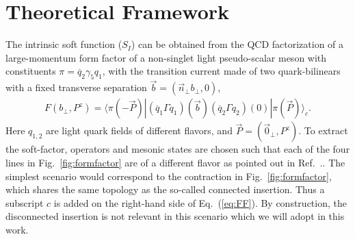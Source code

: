 \section{Theoretical Framework}
The intrinsic soft function ($S_I$) can be obtained from the QCD
factorization of a large-momentum form factor of a non-singlet light pseudo-scalar meson with constituents $\pi=\overline{q}_2\gamma_5 q_1$, with the transition current made of two quark-bilinears 
with a fixed transverse separation $\vec{b}=(\vec{n}_\perp b_\perp, 0)$,
\begin{align}\label{eq:FF}
F(b_\perp,P^z)=\langle \pi(-\vec{P})|(\overline{q}_1\Gamma q_1)(\vec{b}) (\overline{q}_2\Gamma q_2)(0)|\pi(\vec P)\rangle_c. 
\end{align}
Here $q_{1,2}$ are light quark fields of different flavors, and $\vec{P}=(\vec{0}_{\perp},P^z)$.  {To extract the soft-factor, {operators and mesonic states are chosen such that each of the four lines in Fig.~\ref{fig:formfactor} are of a different
flavor as pointed out in Ref.~\cite{Ji:2019sxk}.}. The simplest scenario would correspond to the contraction in Fig.~\ref{fig:formfactor}, which shares the same topology as the so-called connected insertion. Thus  a subscript $c$ is added on the right-hand side of Eq.~(\ref{eq:FF}). By construction, the disconnected insertion   is not relevant  in this scenario which we will adopt in this work. }


